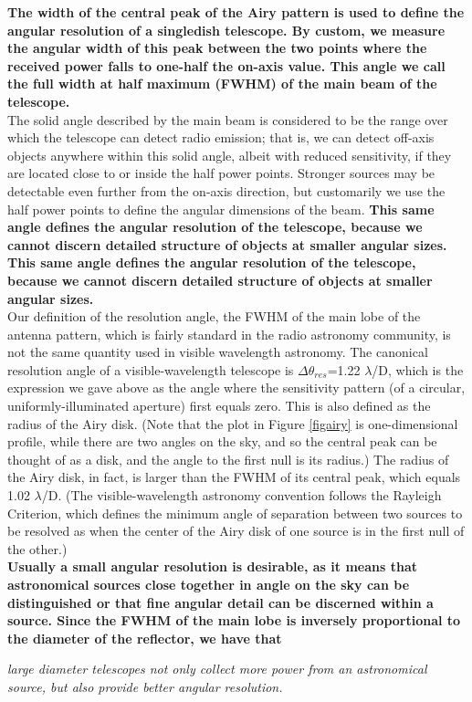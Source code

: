 \documentclass[10pt]{report}
\begin{document}
\textbf{The width of the central peak of the Airy pattern is used to define the angular resolution of a singledish telescope.  By custom, we measure the angular width of this peak between the two points where the received power falls to one-half the on-axis value.  This angle we call the full width at half maximum (FWHM) of the main beam of the telescope.  }\\
The solid angle described by the main beam is considered to be the range over which the telescope can detect radio emission; that is, we can detect off-axis objects anywhere within this solid angle, albeit with reduced sensitivity, if they are located close to or inside the half power points.  Stronger sources may be detectable even further from the on-axis direction, but customarily we use the half power points to define the angular dimensions of the beam. \textbf{ This same angle defines the angular resolution of the telescope, because we cannot discern detailed structure of objects at smaller angular sizes.  This same angle defines the angular resolution of the telescope, because we cannot discern detailed structure of objects at smaller angular sizes. }\\
Our definition of the resolution angle, the FWHM of the main lobe of the antenna pattern, which is fairly standard in the radio astronomy community, is not the same quantity used in visible wavelength astronomy.  The canonical resolution angle of a visible-wavelength telescope is $\Delta \theta_{res}$=1.22 $\lambda$/D, which is the expression we gave above as the angle where the sensitivity pattern (of a circular, uniformly-illuminated aperture) first equals zero.  This is also defined as the radius of the Airy disk.  (Note that the plot in Figure \ref{figairy} is one-dimensional profile, while there are two angles on the sky, and so the central peak can be thought of as a disk, and the angle to the first null is its radius.)  The radius of the Airy disk, in fact, is larger than the FWHM of its central peak, which equals 1.02 $\lambda$/D.  (The visible-wavelength astronomy convention follows the Rayleigh Criterion, which defines the minimum angle of separation between two sources to be resolved as when the center of the Airy disk of one source is in the first null of the other.)\\
\textbf{Usually a small angular resolution is desirable, as it means that astronomical sources close together in angle on the sky can be distinguished or that fine angular detail can be discerned within a source.  Since the FWHM of the main lobe is inversely proportional to the diameter of the reflector, we have that }\\
\begin{center}
\textit{large diameter telescopes not only collect more power from an astronomical source, but also provide better angular resolution. }
\end{center}
\end{document}
